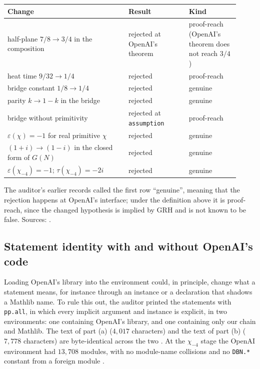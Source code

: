 \documentclass[11pt]{article}
\theoremstyle{definition}
\newcommand{\lean}[1]{\texttt{#1}}
\begin{document}
\begin{center}\small
\begin{tabular}{@{}P{0.48\linewidth}P{0.24\linewidth}P{0.2\linewidth}@{}}
\toprule
Change & Result & Kind \\
\midrule
half-plane $7/8 \to 3/4$ in the composition & rejected at OpenAI's theorem & proof-reach (OpenAI's theorem does not reach $3/4$) \\
heat time $9/32 \to 1/4$ & rejected & proof-reach \\
bridge constant $1/8 \to 1/4$ & rejected & genuine \\
parity $k \to 1-k$ in the bridge & rejected & genuine \\
bridge without primitivity & rejected at \lean{assumption} & proof-reach \\
$\varepsilon(\chi) = -1$ for real primitive $\chi$ & rejected & genuine \\
$(1+i) \to (1-i)$ in the closed form of $G(N)$ & rejected & genuine \\
$\varepsilon(\chi_{-4}) = -1$; $\tau(\chi_{-4}) = -2i$ & rejected & genuine \\
\bottomrule
\end{tabular}
\end{center}

\noindent
The auditor's earlier records called the first row ``genuine'', meaning that the rejection happens at OpenAI's interface; under the definition above it is proof-reach, since the changed hypothesis is implied by GRH and is not known to be false. Sources: \cite[REVIEW\_GAUSS\_SIGN\_AND\_OAI \S\S A.6, B.5; ADD1 \S\S2, 3; REVIEW\_D2bp\_CHI4]{bbrecords}.

\subsection{Statement identity with and without OpenAI's code}

Loading OpenAI's library into the environment could, in principle, change what a statement means, for instance through an instance or a declaration that shadows a Mathlib name. To rule this out, the auditor printed the statements with \lean{pp.all}, in which every implicit argument and instance is explicit, in two environments: one containing OpenAI's library, and one containing only our chain and Mathlib. The text of part (a) ($4{,}017$ characters) and the text of part (b) ($7{,}778$ characters) are byte-identical across the two \cite[REVIEW\_GAUSS\_SIGN\_AND\_OAI \S B.3; ADD1 \S3]{bbrecords}. At the $\chi_{-4}$ stage the OpenAI environment had $13{,}708$ modules, with no module-name collisions and no \lean{DBN.*} constant from a foreign module \cite[REPORT\_OAI\_PORT]{bbrecords}.
\end{document}
